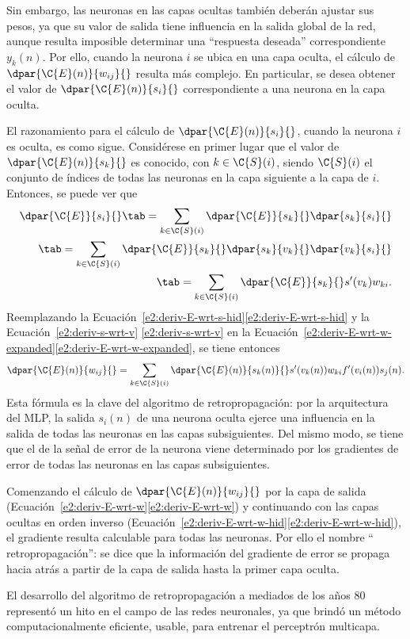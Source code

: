 Sin embargo, las neuronas en las capas ocultas también deberán ajustar
sus pesos, ya que su valor de salida tiene influencia en la salida
global de la red, aunque resulta imposible determinar una ``respuesta
deseada'' correspondiente $y_k(n)$.  Por ello, cuando la neurona $i$
se ubica en una capa oculta, el cálculo de $\dpar{\C{E}(n)}{w_{ij}}{}$
resulta más complejo.  En particular, se desea obtener el valor de
$\dpar{\C{E}(n)}{s_i}{}$ correspondiente a una neurona en la capa
oculta.

El razonamiento para el cálculo de $\dpar{\C{E}(n)}{s_{i}}{}$, cuando
la neurona $i$ es oculta, es como sigue. Considérese en primer lugar
que el valor de $\dpar{\C{E}(n)}{s_k}{}$ es conocido, con
$k\in{}\C{S}(i)$, siendo $\C{S}(i)$ el conjunto de índices de todas
las neuronas en la capa siguiente a la capa de $i$.  Entonces, se
puede ver que
%
\begin{align}
  \dpar{\C{E}}{s_i}{} \tab= \sum_{k\in\C{S}(i)}
      \dpar{\C{E}}{s_k}{}\dpar{s_k}{s_i}{} \notag\\
    \tab= \sum_{k\in\C{S}(i)}
      \dpar{\C{E}}{s_k}{}\dpar{s_k}{v_k}{}\dpar{v_k}{s_i}{} \notag\\
    \tab= \sum_{k\in\C{S}(i)} \dpar{\C{E}}{s_k}{} s'(v_k) w_{ki}.
    \label{e2:deriv-E-wrt-s-hid}
\end{align}
%
Reemplazando la
\iflatexml{}Ecuación~\ref{e2:deriv-E-wrt-s-hid}\else\autoref{e2:deriv-E-wrt-s-hid}\fi{}
y la \iflatexml{}Ecuación~\ref{e2:deriv-s-wrt-v}
\else\autoref{e2:deriv-s-wrt-v}\fi{} en la
\iflatexml{}Ecuación~\ref{e2:deriv-E-wrt-w-expanded}\else\autoref{e2:deriv-E-wrt-w-expanded}\fi,
se tiene entonces
%
\begin{align}\label{e2:deriv-E-wrt-w-hid}
  \dpar{\C{E}(n)}{w_{ij}}{} =
  \sum_{k\in\C{S}(i)} \dpar{\C{E}(n)}{s_k(n)}{} s'(v_k(n)) w_{ki}
  f'(v_i(n)) s_j(n).
\end{align}
%
Esta fórmula es la clave del algoritmo de retropropagación: por la
arquitectura del MLP, la salida $s_i(n)$ de una neurona oculta ejerce
una influencia en la salida de todas las neuronas en las capas
subsiguientes.  Del mismo modo, se tiene que el  de
la señal de error de la neurona viene determinado por los gradientes
de error de todas las neuronas en las capas subsiguientes.

Comenzando el cálculo de $\dpar{\C{E}(n)}{w_{ij}}{}$ por la capa de
salida
(\iflatexml{}Ecuación~\ref{e2:deriv-E-wrt-w}\else\autoref{e2:deriv-E-wrt-w}\fi)
y continuando con las capas ocultas en orden inverso
(\iflatexml{}Ecuación~\ref{e2:deriv-E-wrt-w-hid}\else\autoref{e2:deriv-E-wrt-w-hid}\fi),
el gradiente resulta calculable para todas las neuronas.  Por ello el
nombre `` retropropagación'': se dice que la información del gradiente
de error se propaga hacia atrás a partir de la capa de salida hasta la
primer capa oculta.

El desarrollo del algoritmo de retropropagación a mediados de los años
80 representó un hito en el campo de las redes neuronales, ya
que brindó un método computacionalmente eficiente, usable, para
entrenar el perceptrón multicapa.

